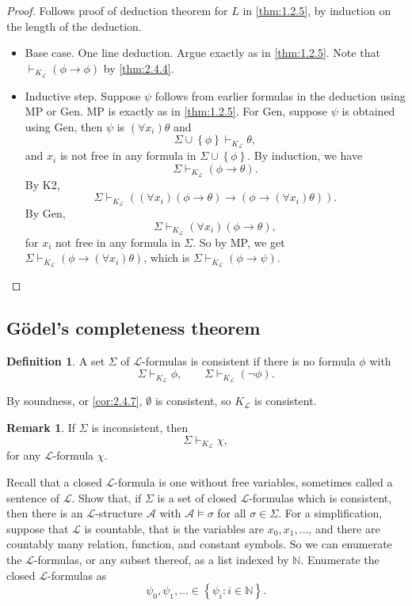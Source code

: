 \documentclass{article}
\newcommand{\N}{\mathbb{N}}
\newcommand{\A}{\mathcal{A}}
\renewcommand{\L}{\mathcal{L}}
\newcommand{\rb}[1]{\left( #1 \right)}
\newcommand{\cb}[1]{\left\{ #1 \right\}}
\newcommand{\notb}[1]{\rb{\neg #1}}
\newcommand{\impb}[2]{\rb{#1 \rightarrow #2}}
\newcommand{\fab}[1]{\rb{\forall #1}}
\theoremstyle{definition}\newtheorem{definition}{Definition}[subsection]
\theoremstyle{definition}\newtheorem{remark1}[definition]{Remark}
\theoremstyle{definition}\newtheorem{example1}[definition]{Example}
\theoremstyle{definition}\newtheorem*{remark2}{Remark}
\theoremstyle{definition}\newtheorem*{example2}{Example}
\theoremstyle{definition}\newtheorem*{note}{Note}
\theoremstyle{definition}\newtheorem*{notation}{Notation}
\begin{document}
\begin{proof}
Follows proof of deduction theorem for $ L $ in \ref{thm:1.2.5}, by induction on the length of the deduction.
\begin{itemize}
\item Base case. One line deduction. Argue exactly as in \ref{thm:1.2.5}. Note that $ \vdash_{K_{\L}} \impb{\phi}{\phi} $ by \ref{thm:2.4.4}.
\item Inductive step. Suppose $ \psi $ follows from earlier formulas in the deduction using MP or Gen. MP is exactly as in \ref{thm:1.2.5}. For Gen, suppose $ \psi $ is obtained using Gen, then $ \psi $ is $ \fab{x_i}\theta $ and
$$ \Sigma \cup \cb{\phi} \vdash_{K_{\L}} \theta, $$
and $ x_i $ is not free in any formula in $ \Sigma \cup \cb{\phi} $. By induction, we have
$$ \Sigma \vdash_{K_{\L}} \impb{\phi}{\theta}. $$
By K2,
$$ \Sigma \vdash_{K_{\L}} \impb{\fab{x_i}\impb{\phi}{\theta}}{\impb{\phi}{\fab{x_i}\theta}}. $$
By Gen,
$$ \Sigma \vdash_{K_{\L}} \fab{x_i}\impb{\phi}{\theta}, $$
for $ x_i $ not free in any formula in $ \Sigma $. So by MP, we get $ \Sigma \vdash_{K_{\L}} \impb{\phi}{\fab{x_i}\theta} $, which is $ \Sigma \vdash_{K_{\L}} \impb{\phi}{\psi} $.
\end{itemize}
\end{proof}


\subsection{G\"odel's completeness theorem}

\begin{definition}
A set $ \Sigma $ of $ \L $-formulas is consistent if there is no formula $ \phi $ with
$$ \Sigma \vdash_{K_{\L}} \phi, \qquad \Sigma \vdash_{K_{\L}} \notb{\phi}. $$
\end{definition}

By soundness, or \ref{cor:2.4.7}, $ \emptyset $ is consistent, so $ K_{\L} $ is consistent.

\begin{remark2}
If $ \Sigma $ is inconsistent, then
$$ \Sigma \vdash_{K_{\L}} \chi, $$
for any $ \L $-formula $ \chi $.
\end{remark2}

Recall that a closed $ \L $-formula is one without free variables, sometimes called a sentence of $ \L $. Show that, if $ \Sigma $ is a set of closed $ \L $-formulas which is consistent, then there is an $ \L $-structure $ \A $ with $ \A \vDash \sigma $ for all $ \sigma \in \Sigma $. For a simplification, suppose that $ \L $ is countable, that is the variables are $ x_0, x_1, \dots $, and there are countably many relation, function, and constant symbols. So we can enumerate the $ \L $-formulas, or any subset thereof, as a list indexed by $ \N $. Enumerate the closed $ \L $-formulas as
$$ \psi_0, \psi_1, \dots \in \cb{\psi_i : i \in \N}. $$
\end{document}

